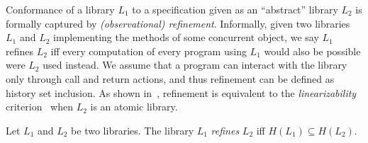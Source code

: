 Conformance of a library $L_1$ to a specification given as an ``abstract'' library $L_2$ 
is formally captured by \emph{(observational) refinement}. Informally, given two libraries
$L_1$ and $L_2$ implementing the methods of some concurrent object, we
say $L_1$ refines $L_2$ if{f} every computation of every program
using $L_1$ would also be possible were $L_2$ used instead. We assume that a program can 
interact with the library only through call and return actions, and thus refinement can be defined
as history set inclusion. As shown in~\citet{journals/tcs/FilipovicORY10,DBLP:conf/popl/BouajjaniEEH15},
refinement is equivalent to the \emph{linearizability} criterion~\cite{journals/toplas/HerlihyW90} when $L_2$ is an atomic library. 

\begin{definition}
Let $L_1$ and $L_2$ be two libraries. 
The library $L_1$ \emph{refines} $L_2$ if{f} $H(L_1) \subseteq H(L_2)$.
\end{definition}


